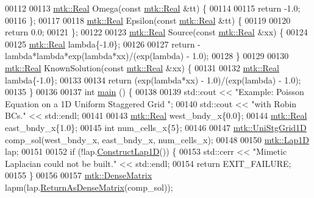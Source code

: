 \begin{DoxyCode}
00112 
00113 \hyperlink{group__c01-roots_gac080bbbf5cbb5502c9f00405f894857d}{mtk::Real} Omega(\textcolor{keyword}{const} \hyperlink{group__c01-roots_gac080bbbf5cbb5502c9f00405f894857d}{mtk::Real} &tt) \{
00114 
00115   \textcolor{keywordflow}{return} -1.0;
00116 \};
00117 
00118 \hyperlink{group__c01-roots_gac080bbbf5cbb5502c9f00405f894857d}{mtk::Real} Epsilon(\textcolor{keyword}{const} \hyperlink{group__c01-roots_gac080bbbf5cbb5502c9f00405f894857d}{mtk::Real} &tt) \{
00119 
00120   \textcolor{keywordflow}{return} 0.0;
00121 \};
00122 
00123 \hyperlink{group__c01-roots_gac080bbbf5cbb5502c9f00405f894857d}{mtk::Real} Source(\textcolor{keyword}{const} \hyperlink{group__c01-roots_gac080bbbf5cbb5502c9f00405f894857d}{mtk::Real} &xx) \{
00124 
00125   \hyperlink{group__c01-roots_gac080bbbf5cbb5502c9f00405f894857d}{mtk::Real} lambda\{-1.0\};
00126 
00127   \textcolor{keywordflow}{return} -lambda*lambda*exp(lambda*xx)/(exp(lambda) - 1.0);
00128 \}
00129 
00130 \hyperlink{group__c01-roots_gac080bbbf5cbb5502c9f00405f894857d}{mtk::Real} KnownSolution(\textcolor{keyword}{const} \hyperlink{group__c01-roots_gac080bbbf5cbb5502c9f00405f894857d}{mtk::Real} &xx) \{
00131 
00132   \hyperlink{group__c01-roots_gac080bbbf5cbb5502c9f00405f894857d}{mtk::Real} lambda\{-1.0\};
00133 
00134   \textcolor{keywordflow}{return} (exp(lambda*xx) - 1.0)/(exp(lambda) - 1.0);
00135 \}
00136 
00137 \textcolor{keywordtype}{int} \hyperlink{poisson__1d_8cc_ae66f6b31b5ad750f1fe042a706a4e3d4}{main} () \{
00138 
00139   std::cout << \textcolor{stringliteral}{"Example: Poisson Equation on a 1D Uniform Staggered Grid "};
00140   std::cout << \textcolor{stringliteral}{"with Robin BCs."} << std::endl;
00141 
00143   \hyperlink{group__c01-roots_gac080bbbf5cbb5502c9f00405f894857d}{mtk::Real} west\_bndy\_x\{0.0\};
00144   \hyperlink{group__c01-roots_gac080bbbf5cbb5502c9f00405f894857d}{mtk::Real} east\_bndy\_x\{1.0\};
00145   \textcolor{keywordtype}{int} num\_cells\_x\{5\};
00146 
00147   \hyperlink{classmtk_1_1UniStgGrid1D}{mtk::UniStgGrid1D} comp\_sol(west\_bndy\_x, east\_bndy\_x, num\_cells\_x);
00148 
00150   \hyperlink{classmtk_1_1Lap1D}{mtk::Lap1D} lap;
00151 
00152   \textcolor{keywordflow}{if} (!lap.\hyperlink{classmtk_1_1Lap1D_a685dcba88c08cf5b7b6c2aa4669a472c}{ConstructLap1D}()) \{
00153     std::cerr << \textcolor{stringliteral}{"Mimetic Laplacian could not be built."} << std::endl;
00154     \textcolor{keywordflow}{return} EXIT\_FAILURE;
00155   \}
00156 
00157   \hyperlink{classmtk_1_1DenseMatrix}{mtk::DenseMatrix} lapm(lap.\hyperlink{classmtk_1_1Lap1D_aaea34a17b0879e05eb4109645a2ba8f4}{ReturnAsDenseMatrix}(comp\_sol));

\end{DoxyCode}
